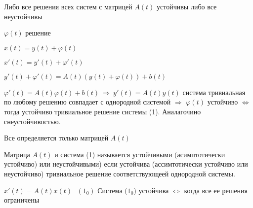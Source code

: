\begin{block}[Утверждение]
  Либо все решения всех систем с матрицей $A(t)$ устойчивы либо все неустойчивы

  $\varphi(t)$ решение

  $x(t) = y(t) + \varphi(t)$

  $x'(t) = y'(t) + \varphi'(t)$

  $y'(t) + \varphi'(t) = A(t)(y(t) + \varphi(t)) + b(t)$

  $\varphi'(t) = A(t)\varphi(t) + b(t) ~ \Rightarrow ~ y'(t) = A(t)y(t)$
  система тривиальная по любому решению совпадает с однородной системой
  $\Rightarrow$ $\varphi(t)$ устойчиво $\Leftrightarrow$ тогда устойчиво
  тривиальное решение системы (1). Аналагочино снеустойчивостью.

  Все определяется только матрицей $A(t)$
\end{block}

\begin{define}
  Матрица $A(t)$ и система (1) называется устойчивыми (асимптотически устойчиво)
  или неустойчивыми) если устойчива (ассимтотически устойчиво или неустойчиво)
  тривиальное решение соответствующеей однородной системы.
\end{define}

\begin{block}[Утверждение 1]
  $x'(t) = A(t)x(t) ~~~ (1_0)$
  Система ($1_0$) устойчива $\Leftrightarrow$ когда все ее решения ограничены
\end{block}

